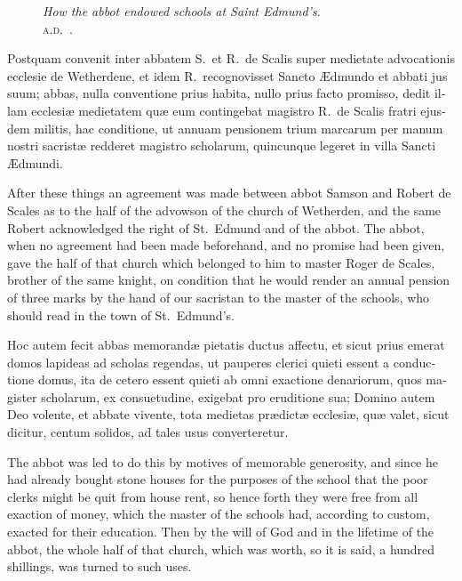 \documentclass[10pt]{book}
\newcommand{\blockhead}[4][]{
\begin{figure}
\centering
\vspace{#4}
\parbox{2.75cm}{\begin{center}\footnotesize \color{BrickRed} \emph{#2}\\ #1 \end{center}}
\end{figure}
}
\begin{document}
\begin{paracol}{2}
\switchcolumn*

\begin{otherlanguage}{latin}
\blockhead[\textsc{a.d}.\ .]{How the abbot endowed schools at Saint Edmund's.}{4}{-.55cm} 
Postquam convenit inter abbatem S.\ et R.\ de Scalis super medietate advocationis ecclesie de Wetherdene, et idem R.\ recognovisset Sancto \AE{}dmundo et abbati jus suum; abbas, nulla conventione prius habita, nullo prius facto promisso, dedit illam ecclesi\ae{} medietatem qu\ae{} eum contingebat magistro R.\ de Scalis fratri ejusdem militis, hac conditione, ut annuam pensionem trium marcarum per manum nostri sacrist\ae{} redderet magistro scholarum, quincunque legeret in villa Sancti \AE{}dmundi.

\end{otherlanguage}

\switchcolumn

After these things an agreement was made between abbot Samson and Robert de Scales as to the half of the advowson of the church of Wetherden, and the same Robert acknowledged the right of St.\ Edmund and of the abbot. The abbot, when no agreement had been made beforehand, and no promise had been given, gave the half of that church which belonged to him to master Roger de Scales, brother of the same knight, on condition that he would render an annual pension of three marks by the hand of our sacristan to the master of the schools, who should read in the town of St.\ Edmund's.

\switchcolumn*

\begin{otherlanguage}{latin}
Hoc autem fecit abbas memorand\ae{} pietatis ductus affectu, et sicut prius emerat domos lapideas ad scholas regendas, ut pauperes clerici quieti essent a conductione domus, ita de cetero essent quieti ab omni exactione denariorum, quos magister scholarum, ex consuetudine, exigebat pro eruditione sua; Domino autem Deo volente, et abbate vivente, tota medietas pr\ae{}dict\ae{} ecclesi\ae{}, qu\ae{} valet, sicut dicitur, centum solidos, ad tales usus converteretur.
\end{otherlanguage}

\switchcolumn

The abbot was led to do this by motives of memorable generosity, and since he had already bought stone houses for the purposes of the school that the poor clerks might be quit from house rent, so hence forth they were free from all exaction of money, which the master of the schools had, according to custom, exacted for their education. Then by the will of God and in the lifetime of the abbot, the whole half of that church, which was worth, so it is said, a hundred shillings, was turned to such uses.


\end{paracol}
\end{document}

